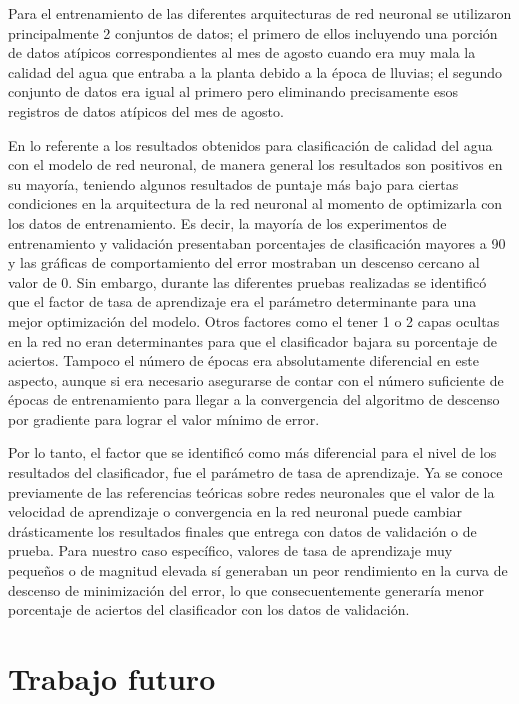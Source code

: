 Para el entrenamiento de las diferentes arquitecturas de red neuronal se utilizaron principalmente 2 conjuntos de datos; el primero de ellos incluyendo una porción de datos atípicos correspondientes al mes de agosto cuando 
era muy mala la calidad del agua que entraba a la planta debido a la época de lluvias; el segundo conjunto de datos era igual al primero pero eliminando precisamente esos registros de datos atípicos del mes de agosto. 

En lo referente a los resultados obtenidos para clasificación de calidad del agua con el modelo de red neuronal, de manera general los resultados son positivos en su mayoría, teniendo algunos resultados de puntaje más bajo 
para ciertas condiciones en la arquitectura de la red neuronal al momento de optimizarla con los datos de entrenamiento. Es decir, la mayoría de los experimentos de entrenamiento y validación presentaban porcentajes de clasificación 
mayores a 90 y las gráficas de comportamiento del error mostraban un descenso cercano al valor de 0. Sin embargo, durante las diferentes pruebas realizadas se identificó que el factor de tasa de aprendizaje era el parámetro 
determinante para una mejor optimización del modelo. Otros factores como el tener 1 o 2 capas ocultas en la red no eran determinantes para que el clasificador bajara su porcentaje de aciertos. Tampoco el número de épocas 
era absolutamente diferencial en este aspecto, aunque si era necesario asegurarse de contar con el número suficiente de épocas de entrenamiento para llegar a la convergencia del algoritmo de descenso por gradiente para lograr 
el valor mínimo de error.

Por lo tanto, el factor que se identificó como más diferencial para el nivel de los resultados del clasificador, fue el parámetro de tasa de aprendizaje. Ya se conoce previamente de las referencias teóricas sobre redes neuronales 
que el valor de la velocidad de aprendizaje o convergencia en la red neuronal puede cambiar drásticamente los resultados finales que entrega con datos de validación o de prueba. Para nuestro caso específico, valores de tasa 
de aprendizaje muy pequeños o de magnitud elevada sí generaban un peor rendimiento en la curva de descenso de minimización del error, lo que consecuentemente generaría menor porcentaje de aciertos del clasificador con los 
datos de validación.

\section{Trabajo futuro}

